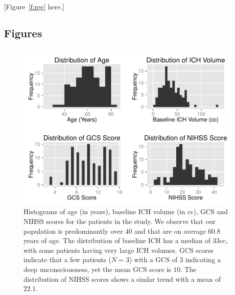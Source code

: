 \documentclass[10pt]{article}\usepackage[]{graphicx}\usepackage[]{color}
\begin{document}
[Figure~\ref{f:reg} here.]



\subsection{Figures}

\begin{figure}[H]
\begin{center}
\includegraphics[scale=1]{histdem.pdf}
\end{center}
\caption{Histograms of age (in years), baseline ICH volume (in cc), GCS and NIHSS scores for the patients in the study. We observe that our population is predominantly over $40$ and that are on average 60.8 years of age.  The distribution of baseline ICH has a median of 33cc, with some patients having very large ICH volumes.  GCS scores indicate that a few patients ($N = 3$) with a GCS of $3$ indicating a deep unconsciousness, yet the mean GCS score is $10$.  The distribution of NIHSS scores shows a simlar trend with a mean of $22.1$.   }\label{fig:histdem}
\end{figure}
\end{document}
